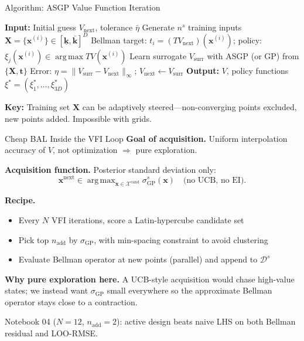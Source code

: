 \documentclass[aspectratio=169,11pt]{beamer}
\newcommand{\emphc}[1]{\textcolor{harvardcrimson}{#1}}
\newcommand{\x}{\bm{x}}
\newcommand{\X}{\bm{X}}
\DeclareMathOperator*{\argmax}{arg\,max}
\begin{document}
\begin{frame}[fragile]{Algorithm: ASGP Value Function Iteration}
\tiny
\begin{algorithmic}[1]
\STATE \textbf{Input:} Initial guess $V_{\text{next}}$, tolerance $\bar{\eta}$
\WHILE{$\eta > \bar{\eta}$}
    \STATE Generate $n^s$ training inputs $\X = \{\x^{(i)}\} \in [\underline{\bm{k}}, \bar{\bm{k}}]^D$
    \FOR{$\x^{(i)} \in \X$}
        \STATE Bellman target: $t_i = (TV_{\text{next}})(\x^{(i)})$; \quad policy: $\xi_j(\x^{(i)}) \in \argmax TV(\x^{(i)})$
    \ENDFOR
    \STATE Learn surrogate $V_{\text{surr}}$ with ASGP (or GP) from $\{\X, \bm{t}\}$
    \STATE Error: $\eta = \|V_{\text{surr}} - V_{\text{next}}\|_\infty$; \quad $V_{\text{next}} \leftarrow V_{\text{surr}}$
\ENDWHILE
\STATE \textbf{Output:} $V$, policy functions $\xi^* = (\xi_1^*, \ldots, \xi_{3D}^*)$
\end{algorithmic}

\vspace{0.3em}
{\scriptsize \textbf{Key:} Training set $\X$ can be \emphc{adaptively steered}---non-converging points excluded, new points added. Impossible with grids.}
\end{frame}

\begin{frame}{Cheap BAL Inside the VFI Loop}
\textbf{Goal of acquisition.} Uniform interpolation accuracy of $V$, not optimization $\Rightarrow$ pure exploration.

\medskip
\textbf{Acquisition function.} Posterior standard deviation only:
\[
\x^{\text{next}} \in \argmax_{\x \in \mathcal{X}^{\text{cand}}} \sigma_{\text{GP}}^s(\x)
\quad \text{(no UCB, no EI).}
\]

\medskip
\textbf{Recipe.}
\begin{itemize}\itemsep0pt
  \item Every $N$ VFI iterations, score a Latin-hypercube candidate set
  \item Pick top $n_{\text{add}}$ by $\sigma_{\text{GP}}$, with min-spacing constraint to avoid clustering
  \item Evaluate Bellman operator at new points (parallel) and append to $\mathcal{D}^s$
\end{itemize}

\medskip
\textbf{Why pure exploration here.} A UCB-style acquisition would chase high-value states; we instead want $\sigma_{\text{GP}}$ small \emphc{everywhere} so the approximate Bellman operator stays close to a contraction.

\medskip
{\scriptsize Notebook 04 ($N=12$, $n_{\text{add}}=2$): active design beats naive LHS on both Bellman residual and LOO-RMSE.}
\end{frame}
\end{document}
